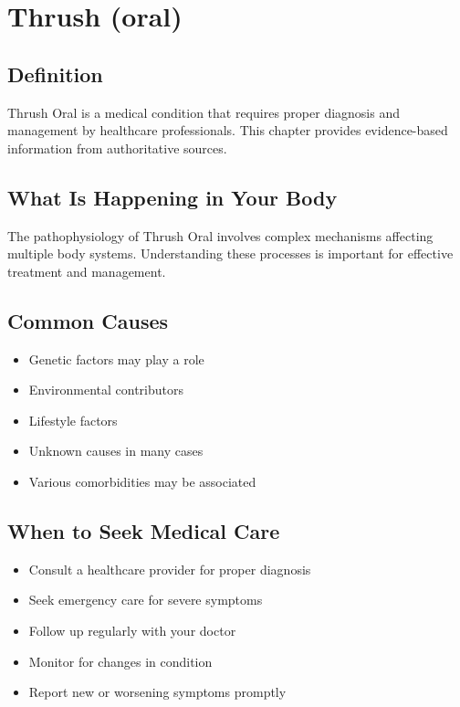 
\chapter{Thrush (oral)}

\section*{Definition}
Thrush Oral is a medical condition that requires proper diagnosis and management by healthcare professionals. This chapter provides evidence-based information from authoritative sources.

\section*{What Is Happening in Your Body}
The pathophysiology of Thrush Oral involves complex mechanisms affecting multiple body systems. Understanding these processes is important for effective treatment and management.

\section*{Common Causes}
\begin{itemize}
  \item Genetic factors may play a role
  \item Environmental contributors
  \item Lifestyle factors
  \item Unknown causes in many cases
  \item Various comorbidities may be associated
\end{itemize}

\section*{When to Seek Medical Care}
\begin{itemize}
  \item Consult a healthcare provider for proper diagnosis
  \item Seek emergency care for severe symptoms
  \item Follow up regularly with your doctor
  \item Monitor for changes in condition
  \item Report new or worsening symptoms promptly
\end{itemize}

